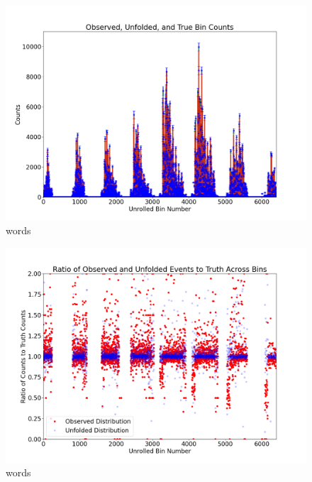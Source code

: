     
    \begin{figure}[ht]
    \centering
    \includegraphics[trim={0 0 0 0},clip,width=\textwidth]{Chapters/Ch5-Further/0_IBU/pics/complete/final_observed_unfolded_and_true_bin_counts.png}
    \caption[words]{words}
    \label{fig:ibu2}
    \end{figure}
    
    \begin{figure}[ht]
    \centering
    \includegraphics[trim={0 0 0 0},clip,width=\textwidth]{Chapters/Ch5-Further/0_IBU/pics/complete/ratio_of_observed_and_unfolded_events_to_truth_across_bins.png}
    \caption[words]{words}
    \label{fig:ibu3}
    \end{figure}

